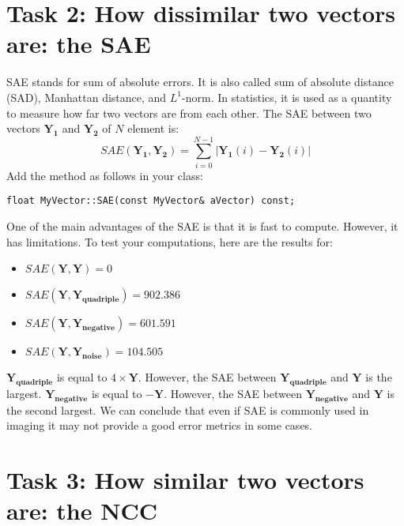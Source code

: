 \documentclass[english,a4paper,12pt,oneside]{article}
\begin{document}
\section*{Task 2: How dissimilar two vectors are: the SAE}

SAE stands for sum of absolute errors. It is also called sum of absolute distance (SAD), Manhattan distance, and $L^1$-norm.  
In statistics, it is used as a quantity to measure how far two vectors are from each other. 
The SAE between two vectors $\mathbf{Y_1}$ and $\mathbf{Y_2}$ of $N$ element is:
\begin{equation}
SAE(\mathbf{Y_1}, \mathbf{Y_2}) = \sum^{N-1}_{i=0} |\mathbf{Y_1}(i)-\mathbf{Y_2}(i)|
\end{equation}
Add the method as follows in your class:
\begin{lstlisting}
float MyVector::SAE(const MyVector& aVector) const;
\end{lstlisting}

One of the main advantages of the SAE is that it is fast to compute.  
However, it has limitations. 
To test your computations, here are the results for:
\begin{itemize}
\item $SAE(\mathbf{Y}, \mathbf{Y}) =  0$
\item $SAE(\mathbf{Y}, \mathbf{Y_{quadriple}}) =  902.386$
\item $SAE(\mathbf{Y}, \mathbf{Y_{negative}}) =  601.591$
\item $SAE(\mathbf{Y}, \mathbf{Y_{noise}}) =  104.505$
\end{itemize}
$\mathbf{Y_{quadriple}}$ is equal to $4 \times \mathbf{Y}$. 
However, the SAE between $\mathbf{Y_{quadriple}}$ and $\mathbf{Y}$ is the largest. 
$\mathbf{Y_{negative}}$ is equal to $\mathbf{-Y}$. 
However, the SAE between $\mathbf{Y_{negative}}$ and $\mathbf{Y}$ is the second largest. 
We can conclude that even if SAE is commonly used in imaging  it may not provide a good error metrics in some cases.

\section*{Task 3: How similar two vectors are: the NCC}
\end{document}
